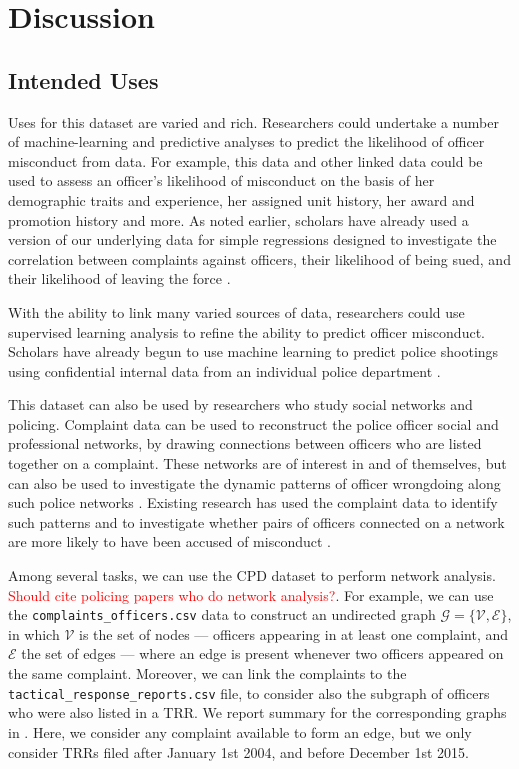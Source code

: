 \section{Discussion} \label{sec:discussion}

\subsection{Intended Uses}
Uses for this dataset are varied and rich. Researchers could undertake a number
of machine-learning and predictive analyses to predict the likelihood of
officer misconduct from data. For example, this data and other linked data
could be used to assess an officer's likelihood of misconduct on the basis of
her demographic traits and experience, her assigned unit history, her award and
promotion history and more. As noted earlier, scholars have already used a
version of our underlying data for simple regressions designed to investigate
the correlation between complaints against officers, their likelihood of being
sued, and their likelihood of leaving the force \cite{Rozema19}. 

With the ability to link many varied sources of data, researchers could use
supervised learning analysis to refine the ability to predict officer
misconduct. Scholars have already begun to use machine learning to predict
police shootings using confidential internal data from an individual police
department \cite{Helsby18}.

This dataset can also be used by researchers who study social networks and
policing. Complaint data can be used to reconstruct the police officer social
and professional networks, by drawing connections between officers who are
listed together on a complaint. These networks are of interest in and of
themselves, but can also be used to investigate the dynamic patterns of officer
wrongdoing along such police networks \cite{Roithmayr16}. Existing research has used the complaint
data to identify such patterns and to investigate whether pairs of officers
connected on a network are more likely to have been accused of misconduct \cite{Ouellet19}.

Among several tasks, we can use the CPD dataset to perform network analysis.
\textcolor{red}{Should cite policing papers who do network analysis?}. For
example, we can use the \texttt{complaints\_officers.csv} data to construct an
undirected graph $\mathcal{G} = \{\mathcal{V}, \mathcal{E}\}$, in which
$\mathcal{V}$ is the set of nodes --- officers appearing in at least one
complaint, and $\mathcal{E}$ the set of edges --- where an edge is present
whenever two officers appeared on the same complaint. Moreover, we can link the
complaints to the \texttt{tactical\_response\_reports.csv} file, to consider
also the subgraph of officers who were also listed in a TRR. We report summary
for the corresponding graphs in . Here, we consider any
complaint available to form an edge, but we only consider TRRs filed after
January 1st 2004, and before December 1st 2015.

